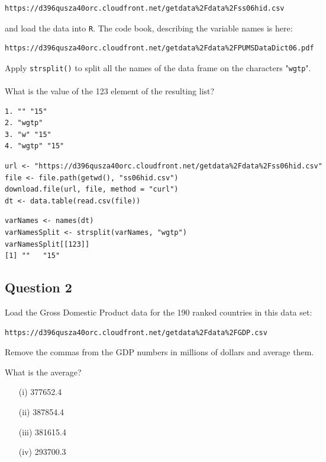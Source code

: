 \documentclass[]{article}
\begin{document}
\begin{verbatim}
https://d396qusza40orc.cloudfront.net/getdata%2Fdata%2Fss06hid.csv 
\end{verbatim}
and load the data into \texttt{R}. The code book, describing the variable names is here: 
\begin{verbatim}
https://d396qusza40orc.cloudfront.net/getdata%2Fdata%2FPUMSDataDict06.pdf 
\end{verbatim}
Apply \texttt{strsplit()} to split all the names of the data frame on the characters "\texttt{wgtp}". \\ \\ What is the value of the 123 element of the resulting list?
\begin{verbatim}
1. "" "15"
2. "wgtp"
3. "w" "15"
4. "wgtp" "15"
\end{verbatim}
\begin{framed}
\begin{verbatim}
url <- "https://d396qusza40orc.cloudfront.net/getdata%2Fdata%2Fss06hid.csv"
file <- file.path(getwd(), "ss06hid.csv")
download.file(url, file, method = "curl")
dt <- data.table(read.csv(file))
\end{verbatim}
\end{framed}
\begin{verbatim}
varNames <- names(dt)
varNamesSplit <- strsplit(varNames, "wgtp")
varNamesSplit[[123]]
[1] ""   "15"
\end{verbatim}
\newpage
\subsection*{Question 2}
Load the Gross Domestic Product data for the 190 ranked countries in this data set: 

\begin{verbatim}
https://d396qusza40orc.cloudfront.net/getdata%2Fdata%2FGDP.csv 
\end{verbatim}
Remove the commas from the GDP numbers in millions of dollars and average them. 

What is the average? 

\begin{itemize}
\item[(i)] 377652.4
\item[(ii)] 387854.4
\item[(iii)] 381615.4
\item[(iv)] 293700.3
\end{itemize}
\end{document}
